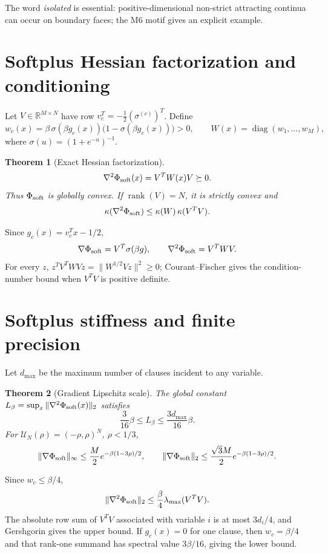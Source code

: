 \documentclass[11pt,a4paper]{article}
\newtheorem{theorem}{Theorem}[section]
\begin{document}
The word \emph{isolated} is essential: positive-dimensional non-strict attracting continua can occur on boundary faces; the M6 motif gives an explicit example.

\section{Softplus Hessian factorization and conditioning}\label{sec:soft}
Let $V\in\mathbb R^{M\times N}$ have row $v_c^T=-\frac12(\sigma^{(c)})^T$. Define
\[
w_c(x)=\beta\,\sigma(\beta g_c(x))\bigl(1-\sigma(\beta g_c(x))\bigr)>0,\qquad W(x)=\operatorname{diag}(w_1,\ldots,w_M),
\]
where $\sigma(u)=(1+e^{-u})^{-1}$.

\begin{theorem}[Exact Hessian factorization]
\[
\nabla^2\Phi_{\rm soft}(x)=V^TW(x)V\succeq0.
\]
Thus $\Phi_{\rm soft}$ is globally convex. If $\operatorname{rank}(V)=N$, it is strictly convex and
\[
\kappa(\nabla^2\Phi_{\rm soft})\le\kappa(W)\,\kappa(V^TV).
\]
\end{theorem}

\noindent Since $g_c(x)=v_c^Tx-1/2$,
\[
\nabla\Phi_{\rm soft}=V^T\sigma(\beta g),\qquad \nabla^2\Phi_{\rm soft}=V^TWV.
\]
For every $z$, $z^TV^TWVz=\|W^{1/2}Vz\|^2\ge0$; Courant--Fischer gives the condition-number bound when $V^TV$ is positive definite.

\section{Softplus stiffness and finite precision}
Let $d_{\max}$ be the maximum number of clauses incident to any variable.

\begin{theorem}[Gradient Lipschitz scale]
The global constant $L_\beta=\sup_x\|\nabla^2\Phi_{\rm soft}(x)\|_2$ satisfies
\[
\frac3{16}\beta\le L_\beta\le\frac{3d_{\max}}{16}\beta.
\]
For $\mathcal U_N(\rho)=(-\rho,\rho)^N$, $\rho<1/3$,
\[
\|\nabla\Phi_{\rm soft}\|_\infty\le\frac M2e^{-\beta(1-3\rho)/2},\qquad
\|\nabla\Phi_{\rm soft}\|_2\le\frac{\sqrt3M}{2}e^{-\beta(1-3\rho)/2}.
\]
\end{theorem}

Since $w_c\le\beta/4$,
\[
\|\nabla^2\Phi_{\rm soft}\|_2\le\frac\beta4\lambda_{\max}(V^TV).
\]
The absolute row sum of $V^TV$ associated with variable $i$ is at most $3d_i/4$, and Gershgorin gives the upper bound. If $g_c(x)=0$ for one clause, then $w_c=\beta/4$ and that rank-one summand has spectral value $3\beta/16$, giving the lower bound.
\end{document}
